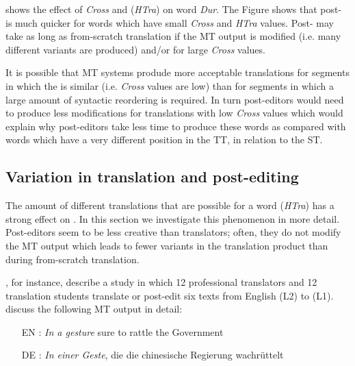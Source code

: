 \documentclass[output=paper]{LSP/langsci}
\begin{document}
 shows the effect of \textit{Cross} and  (\textit{HTra}) on word  \textit{Dur}. The Figure shows that post- is much quicker for words which have small \textit{Cross} and \textit{HTra} values. Post- may take as long as from-scratch translation if the MT output is modified (i.e. many different variants are produced) and/or for large \textit{Cross} values.

It is possible that MT systems produde more acceptable translations for segments in which the  is similar (i.e. \textit{Cross} values are low) than for segments in which a large amount of syntactic reordering is required. In turn post-editors would need to produce less modifications for translations with low \textit{Cross} values which would explain why post-editors take less time to produce these words as compared with words which have a very different position in the TT, in relation to the ST. 


\subsection{Variation in translation and post-editing}
\label{carl-schaeffer:sec:4.3}

The amount of different translations that are possible for a word (\textit{HTra}) has a strong effect on . In this section we investigate this phenomenon in more detail. 
Post-editors seem to be less creative than translators; often, they do not modify the MT output which leads to fewer variants in the translation product than during from-scratch translation. 

\citet{Culo2014}, for instance, describe a study in which 12 professional translators and 12 translation students translate or post-edit six texts from English (L2) to  (L1). \citet{Culo2014} discuss the following MT output in detail:

\begin{itemize}
\item[EN]: \textit{In a gesture} sure to rattle the  Government
\item[DE]: \textit{In einer Geste}, die die chinesische Regierung wachrüttelt 
\end{itemize}
\end{document}
